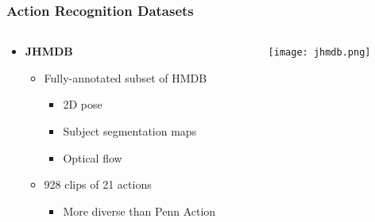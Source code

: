 \documentclass[9pt]{beamer}
\providecommand{\source}{\\ \footnotesize \tugreen{Source:} \footnotemark}
\newenvironment{myframe}[1][]{%
\begin{frame}%
\frametitle{#1}
\setcounter{footnote}{0}


}{%
\end{frame}%
}
\begin{document}
\begin{myframe}[Action Recognition Datasets]
  \begin{columns}[T]
      \begin{column}{.48\textwidth}
          \begin{itemize}
              \item \textbf{JHMDB\footnotemark}
              \begin{itemize}
                  \item Fully-annotated subset of HMDB
                  \begin{itemize}
                      \item 2D pose
                      \item Subject segmentation maps
                      \item Optical flow
                  \end{itemize}
                  \item 928 clips of 21 actions
                  \begin{itemize}
                      \item More diverse than Penn Action
                  \end{itemize}
              \end{itemize}
          \end{itemize}
      \end{column}
      \begin{column}{.48\textwidth}
          \begin{figure}
              \texttt{[image: jhmdb.png]}
              \centering
              \source
          \end{figure}
      \end{column}
  \end{columns}
\end{myframe}
\end{document}
